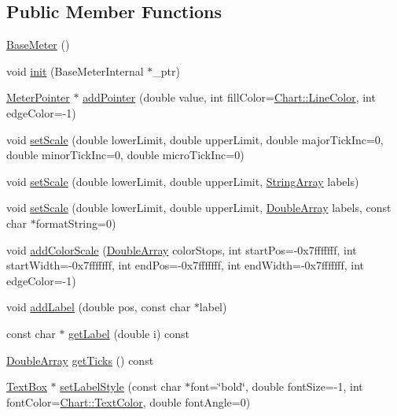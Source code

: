 \subsection*{Public Member Functions}
\begin{DoxyCompactItemize}
\item 
\hyperlink{class_base_meter_a2e8ea1110428a27c5e10cb859a573c9e}{Base\+Meter} ()
\item 
void \hyperlink{class_base_meter_a117c04249783d7acb72ed87dfa7ac92c}{init} (Base\+Meter\+Internal $\ast$\+\_\+ptr)
\item 
\hyperlink{class_meter_pointer}{Meter\+Pointer} $\ast$ \hyperlink{class_base_meter_afa1ed46d9fd3dfc852d170338929795f}{add\+Pointer} (double value, int fill\+Color=\hyperlink{namespace_chart_abee0d882fdc9ad0b001245ad9fc64011a04817a359476e87a5c572a7a69cdaaec}{Chart\+::\+Line\+Color}, int edge\+Color=-\/1)
\item 
void \hyperlink{class_base_meter_a60d236ad098cbca9b689bd7b42b35bd2}{set\+Scale} (double lower\+Limit, double upper\+Limit, double major\+Tick\+Inc=0, double minor\+Tick\+Inc=0, double micro\+Tick\+Inc=0)
\item 
void \hyperlink{class_base_meter_a8b3b33dbe680f892ba3d860b579e727f}{set\+Scale} (double lower\+Limit, double upper\+Limit, \hyperlink{class_string_array}{String\+Array} labels)
\item 
void \hyperlink{class_base_meter_a5bb7919cb0a67c0b578620644d3dc4ae}{set\+Scale} (double lower\+Limit, double upper\+Limit, \hyperlink{class_double_array}{Double\+Array} labels, const char $\ast$format\+String=0)
\item 
void \hyperlink{class_base_meter_ac46f3e2cde5c00a129bb23097d77215d}{add\+Color\+Scale} (\hyperlink{class_double_array}{Double\+Array} color\+Stops, int start\+Pos=-\/0x7fffffff, int start\+Width=-\/0x7fffffff, int end\+Pos=-\/0x7fffffff, int end\+Width=-\/0x7fffffff, int edge\+Color=-\/1)
\item 
void \hyperlink{class_base_meter_ac1509c1c45fab0484842553f81c97365}{add\+Label} (double pos, const char $\ast$label)
\item 
const char $\ast$ \hyperlink{class_base_meter_a2cbaf32dcf5bbec04d4e1ec52091692a}{get\+Label} (double i) const
\item 
\hyperlink{class_double_array}{Double\+Array} \hyperlink{class_base_meter_aaab196f6d5ca6712f2486cb07277269c}{get\+Ticks} () const
\item 
\hyperlink{class_text_box}{Text\+Box} $\ast$ \hyperlink{class_base_meter_af491dea34df9191d9d78abeb0a97172e}{set\+Label\+Style} (const char $\ast$font=\char`\"{}bold\char`\"{}, double font\+Size=-\/1, int font\+Color=\hyperlink{namespace_chart_abee0d882fdc9ad0b001245ad9fc64011a879e14f2f5024caccc047374342321ef}{Chart\+::\+Text\+Color}, double font\+Angle=0)

\end{DoxyCompactItemize}
